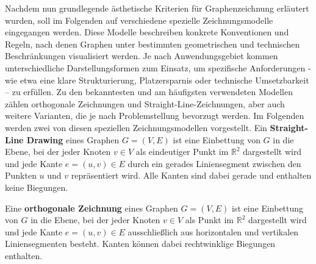 \documentclass[bachelor, german]{algothesis}
\begin{document}
Nachdem nun grundlegende ästhetische Kriterien für Graphenzeichnung erläutert wurden, soll im Folgenden auf verschiedene spezielle Zeichnungsmodelle eingegangen werden. Diese Modelle beschreiben konkrete Konventionen und Regeln, nach denen Graphen unter bestimmten geometrischen und technischen Beschränkungen visualisiert werden.\newline
Je nach Anwendungsgebiet kommen unterschiedliche Darstellungsformen zum Einsatz, um spezifische Anforderungen - wie etwa eine klare Strukturierung, Platzersparnis oder technische Umsetzbarkeit – zu erfüllen. Zu den bekanntesten und am häufigsten verwendeten Modellen zählen orthogonale Zeichnungen und Straight-Line-Zeichnungen, aber auch weitere Varianten, die je nach Problemstellung bevorzugt werden.
Im Folgenden werden zwei von diesen speziellen Zeichnungsmodellen vorgestellt\cite{Handbook}.\newline \newline
Ein \textbf{Straight-Line Drawing}  eines Graphen $G = (V,E)$ ist eine Einbettung von $G$ in die Ebene, bei der jeder Knoten $v \in V$ als eindeutiger Punkt im $\mathbb{R}^2$ dargestellt wird und jede Kante $e = (u,v) \in E$ durch ein gerades Liniensegment zwischen den Punkten $u$ und $v$ repräsentiert wird. Alle Kanten sind dabei gerade und enthalten keine Biegungen.\newline

Eine \textbf{orthogonale Zeichnung} eines Graphen $G = (V,E)$ ist eine Einbettung von $G$ in die Ebene, bei der jeder Knoten $v \in V$ als Punkt im $\mathbb{R}^2$ dargestellt wird und jede Kante $e = (u,v) \in E$ ausschließlich aus horizontalen und vertikalen Liniensegmenten besteht. Kanten können dabei rechtwinklige Biegungen enthalten.\newline
\end{document}
